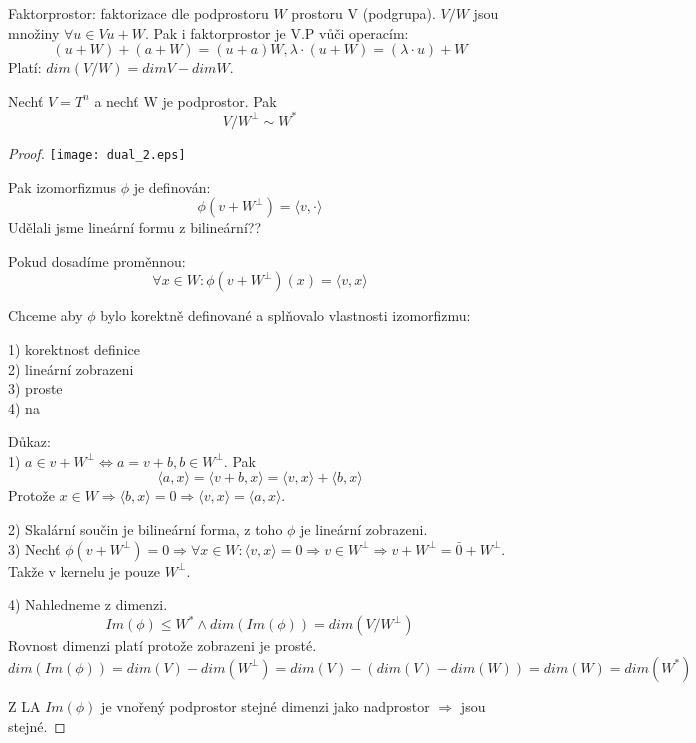 \begin{definition}
Faktorprostor: faktorizace dle podprostoru $W$ prostoru V (podgrupa). $V/W$ jsou množiny $\forall u \in V u + W$. Pak i faktorprostor je V.P vůči operacím:
\[ (u + W) + (a + W) = (u + a)W, \lambda \cdot (u + W) = (\lambda \cdot u) + W \]
Platí: $dim(V/W) = dimV - dim W$.
\end{definition}

\begin{theorem}
	Nechť $V = T^n$ a nechť W je podprostor. Pak
	\[ V/W^{\perp} \sim W^{\ast} \]
\end{theorem}
\begin{proof}
	\texttt{[image: dual\_2.eps]}

	Pak izomorfizmus $\phi$ je definován:
	\[\phi(v + W^{\perp}) = \langle v, \cdot \rangle \]
	Udělali jsme lineární formu z bilineární??

	Pokud dosadíme proměnnou:
	\[\forall x \in W: \phi(v + W^{\perp})(x) = \langle v, x \rangle \]

	Chceme aby $\phi$ bylo korektně definované a splňovalo vlastnosti izomorfizmu:

	1) korektnost definice \\
	2) lineární zobrazeni \\
	3) proste\\
	4) na

	Důkaz:\\
	1) $a \in v + W^{\perp} \iff a = v + b, b \in W^{\perp}$. Pak
	\[ \langle a, x \rangle = \langle v + b, x \rangle = \langle v, x \rangle + \langle b, x \rangle\]
	Protože $x \in W \Rightarrow \langle b, x \rangle = 0 \Rightarrow \langle v, x \rangle = \langle a, x \rangle $.

	2) Skalární součin je bilineární forma, z toho $\phi$ je lineární zobrazeni.\\
	3) Nechť $\phi(v + W^{\perp}) = 0 \Rightarrow \forall x \in W : \langle v, x \rangle = 0 \Rightarrow v \in W^{\perp} \Rightarrow v + W^{\perp} = \bar{0} + W^{\perp}$.
	Takže v kernelu je pouze $W^{\perp}$.

	4) Nahledneme z dimenzi.
	\[ Im(\phi) \leq W^{\ast} \land dim(Im(\phi)) = dim (V/W^{\perp}) \]
	Rovnost dimenzi platí protože zobrazeni je prosté.
	\[ dim(Im(\phi)) = dim(V) - dim(W^{\perp}) = dim(V) - (dim(V) - dim(W)) = dim(W) = dim(W^{\ast}) \]

	Z LA $Im(\phi)$ je vnořený podprostor stejné dimenzi jako nadprostor $\Rightarrow$ jsou stejné.

\end{proof}

